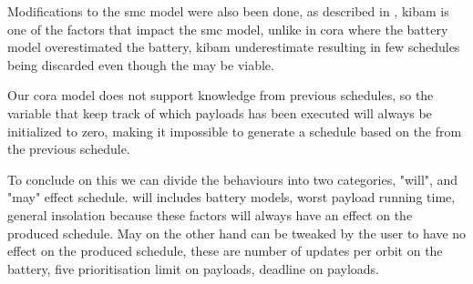 Modifications to the \gls{smc} model were also been done, as described in , \gls{kibam} is one of the factors that impact the \gls{smc} model, unlike in \gls{cora} where the battery model overestimated the battery, \gls{kibam} underestimate resulting in few schedules being discarded even though the may be viable.

Our \gls{cora} model does not support knowledge from previous schedules, so the variable  that keep track of which payloads has been executed will always be initialized to zero, making it impossible to generate a schedule based on the  from the previous schedule.

To conclude on this we can divide the behaviours into two categories, "will", and "may" effect schedule. will includes battery models, worst payload running time, general insolation because these factors will always have an effect on the produced schedule. May on the other hand can be tweaked by the user to have no effect on the produced schedule, these are number of updates per orbit on the battery, five prioritisation limit on payloads, deadline on payloads.



 






